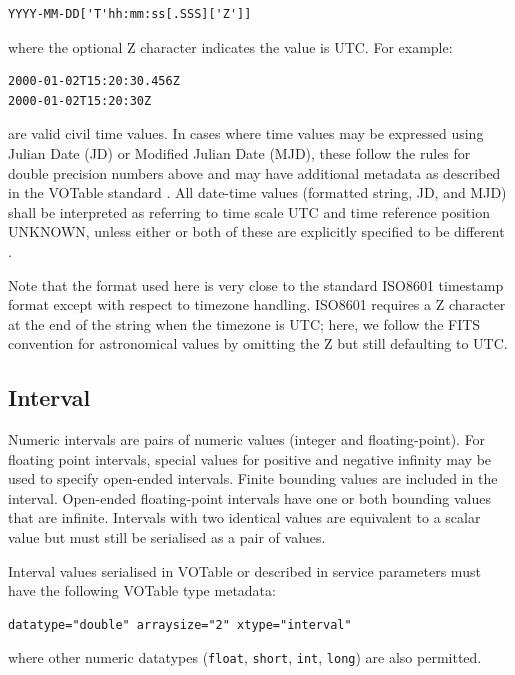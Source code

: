 \documentclass[11pt,letter]{ivoa}
\begin{document}
\begin{verbatim}
YYYY-MM-DD['T'hh:mm:ss[.SSS]['Z']]
\end{verbatim}

\noindent
where the optional Z character indicates the value is UTC. For example:

\begin{verbatim}
2000-01-02T15:20:30.456Z
2000-01-02T15:20:30Z
\end{verbatim}

\noindent
are valid civil time values. In cases where time values may be
expressed using Julian Date (JD) or Modified Julian Date (MJD), these follow the
rules for double precision numbers above and may have additional metadata as
described in the VOTable standard \citep{2019ivoa.spec.1021O}. All date-time values (formatted string, JD,
and MJD) shall be interpreted as referring to time scale UTC and time reference
position UNKNOWN, unless either or both of these are explicitly specified to be
different \citep{2007ivoa.spec.1030R}.

Note that the format used here is very close to the standard ISO8601 timestamp
format except with respect to timezone handling. ISO8601 requires a Z character
at the end of the string when the timezone is UTC; here, we follow the FITS
\citep{std:FITS} convention for astronomical values by omitting the Z but still
defaulting to UTC.

\subsection{Interval}
Numeric intervals are pairs of numeric values (integer and floating-point). For floating point
intervals, special values for positive and negative infinity may be used to specify open-ended intervals.
Finite bounding values are included in the interval. Open-ended floating-point
intervals have one or both bounding values that are infinite. Intervals with two identical values
are equivalent to a scalar value but must still be serialised as a pair of values.

Interval values serialised in VOTable or described in service parameters must have
the following VOTable type metadata:

\begin{verbatim}
datatype="double" arraysize="2" xtype="interval"
\end{verbatim}
\noindent where other numeric datatypes (\verb|float|, \verb|short|, \verb|int|, \verb|long|)
are also permitted.
\end{document}
